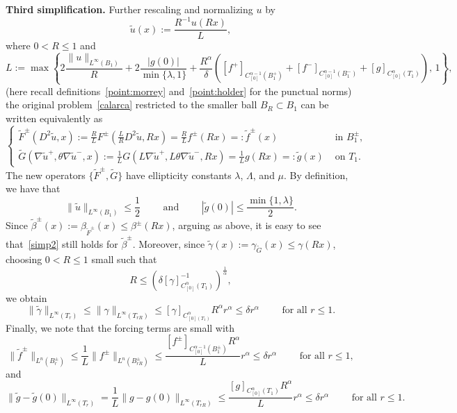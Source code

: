 \documentclass[letter,11pt]{amsart}
\theoremstyle{definition}
\numberwithin{equation}{section}
\begin{document}
\noindent\textbf{Third simplification.}
Further rescaling and normalizing $u$ by
\[
\widetilde{u}(x) := \frac{R^{-1}u(Rx)}{L},
\]
where $0 < R \leq 1$ and
\[
L := \max\left\{
2 \frac{\|u\|_{L^{\infty}(B_{1})}}{R} 
+ 2 \frac{|g(0)|}{\min\{\lambda,1\}}
+ \frac{R^{\alpha}}{\delta}
\left(
[f^{+}]_{C^{\alpha-1}_{[0]}(B_1^{+})} 
+ [f^{-}]_{C^{\alpha-1}_{[0]}(B_1^{-})} 
+ [g]_{C^{\alpha}_{[0]}(T_1)} 
\right), \, 1
\right\},
\]
(here recall definitions~\eqref{point:morrey} and~\eqref{point:holder} for the punctual norms)
the original problem~\eqref{calarca} restricted to the smaller ball $B_{R} \subset B_{1}$ can be written equivalently as
\[
\begin{cases}
\widetilde{F}^{\pm}(D^2 \widetilde{u}, x) := 
\frac{R}{L}
F^{\pm}\left(
\frac{L}{R}D^2 \widetilde{u}, R x\right) = \frac{R}{L} f^{\pm}\left(R x\right) =: \widetilde{f}^{\pm}(x)
& \text{ in } B^{\pm}_1,\\
\widetilde{G}(\nabla \widetilde{u}^{+}, \theta \nabla \widetilde{u}^{-}, x) := 
\frac{1}{L}
G\left( L \nabla \widetilde{u}^{+}, L \theta \nabla \widetilde{u}^{-}, R x\right)
= \frac{1}{L} g\left(R x\right) =: \widetilde{g}(x)
& \text{ on } T_1.
\end{cases}
\]
The new operators $\{\widetilde{F}^{\pm}, \widetilde{G}\}$ have ellipticity constants $\lambda$, $\Lambda$, and $\mu$.
By definition, we have that
\begin{equation}
\label{simp3}
\|\widetilde{u}\|_{L^{\infty}(B_1)} \leq \frac{1}{2} \qquad \text{ and } \qquad |\widetilde{g}(0)| \leq \frac{\min\{1, \lambda\}}{2}.
\end{equation}
Since $\widetilde{\beta}^{\pm}(x) := \beta_{\widetilde{F}^{\pm}}(x) \leq \beta^{\pm}(R x)$, arguing as above, it is easy to see that~\eqref{simp2} still holds for $\widetilde{\beta}^{\pm}$.
Moreover, since $\widetilde{\gamma}(x) := \gamma_{\widetilde{G}}(x) \leq \gamma(R x)$, 
choosing $0 <R \leq 1$ small such that 
\[
R \leq \left(\delta [\gamma]_{C^{\alpha}_{[0]}(T_1)}^{-1}\right)^{\frac{1}{\alpha}},
\]
we obtain
\begin{equation}
\label{simp4}
\|\widetilde{\gamma}\|_{L^{\infty}(T_r)} 
\leq \|\gamma\|_{L^{\infty}(T_{r R})}
\leq [\gamma]_{C^{\alpha}_{[0](T_1)}} R^{\alpha} r^{\alpha}
\leq \delta r^{\alpha}
\qquad \text{ for all } r \leq 1.
\end{equation}
Finally, we note that the forcing terms are small with
\begin{equation}
\label{simp5}
\|\widetilde{f}^{\pm}\|_{L^n(B_r^{\pm})}
\leq \frac{1}{L} \|f^{\pm}\|_{L^n(B^{\pm}_{r R})}
\leq \frac{[f^{\pm}]_{C^{\alpha-1}_{[0]}(B_1^{\pm})}R^{\alpha}}{L} 
r^{\alpha}
\leq \delta r^{\alpha} \qquad \text{ for all } r \leq 1,
\end{equation}
and
\begin{equation}
\label{simp6}
\|\widetilde{g} - \widetilde{g}(0)\|_{L^{\infty}(T_r)} = \frac{1}{L} \|g - g(0)\|_{L^{\infty}(T_{rR})}
\leq  \frac{[g]_{C^{\alpha}_{[0]}(T_1)}R^{\alpha}}{L} r^{\alpha}
\leq \delta r^{\alpha} \qquad \text{ for all } r \leq 1.
\end{equation}
\end{document}
